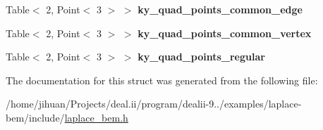 \begin{DoxyCompactItemize}
\mbox{\label{structLaplaceBEM_1_1PairCellWiseScratchData_aa777424b41016df40f6d0afce84debab}} 
Table$<$ 2, Point$<$ 3 $>$ $>$ {\bfseries ky\+\_\+quad\+\_\+points\+\_\+common\+\_\+edge}
\item 
\mbox{\label{structLaplaceBEM_1_1PairCellWiseScratchData_acf4cc1caefb3a07b069d0fb67b2891c6}} 
Table$<$ 2, Point$<$ 3 $>$ $>$ {\bfseries ky\+\_\+quad\+\_\+points\+\_\+common\+\_\+vertex}
\item 
\mbox{\label{structLaplaceBEM_1_1PairCellWiseScratchData_abb536bc3bd66be66d8dcd96bc144859e}} 
Table$<$ 2, Point$<$ 3 $>$ $>$ {\bfseries ky\+\_\+quad\+\_\+points\+\_\+regular}
\end{DoxyCompactItemize}


The documentation for this struct was generated from the following file\+:\begin{DoxyCompactItemize}
\item 
/home/jihuan/\+Projects/deal.\+ii/program/dealii-\/9../examples/laplace-\/bem/include/\hyperlink{laplace__bem_8h}{laplace\+\_\+bem.\+h}\end{DoxyCompactItemize}
